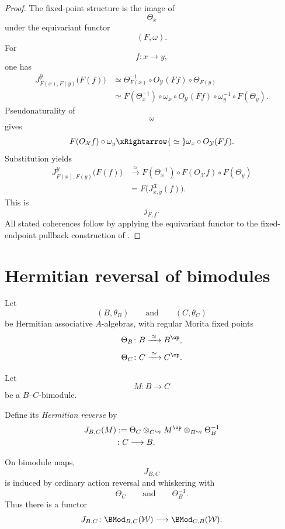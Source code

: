 \begin{proof}
The fixed-point structure is the image of
\[
    \Theta_x
\]
under the equivariant functor
\[
    (F,\omega).
\]
For
\[
    f
    \colon
    x
    \longrightarrow
    y,
\]
one has
\[
\begin{aligned}
    J^{\mathcal Y}_{F(x),F(y)}
    \bigl(
        F(f)
    \bigr)
    &\simeq
    \Theta_{F(x)}^{-1}
    \circ
    O_{\mathcal Y}(Ff)
    \circ
    \Theta_{F(y)}
    \\
    &\simeq
    F(\Theta_x^{-1})
    \circ
    \omega_x
    \circ
    O_{\mathcal Y}(Ff)
    \circ
    \omega_y^{-1}
    \circ
    F(\Theta_y).
\end{aligned}
\]
Pseudonaturality of
\[
    \omega
\]
gives
\[
    F(O_{\mathcal X}f)
    \circ
    \omega_y
    \xRightarrow{\;\simeq\;}
    \omega_x
    \circ
    O_{\mathcal Y}(Ff).
\]
Substitution yields
\[
\begin{aligned}
    J^{\mathcal Y}_{F(x),F(y)}
    \bigl(
        F(f)
    \bigr)
    &\xrightarrow{\;\simeq\;}
    F(\Theta_x^{-1})
    \circ
    F(O_{\mathcal X}f)
    \circ
    F(\Theta_y)
    \\
    &=
    F
    \bigl(
        J^{\mathcal X}_{x,y}(f)
    \bigr).
\end{aligned}
\]
This is
\[
    j_{F,f}.
\]
All stated coherences follow by applying the equivariant functor to the
fixed-endpoint pullback construction of
.
\end{proof}

\section{Hermitian reversal of bimodules}
\label{sec:hermitian-reversal-bimodules}

Let
\[
    (B,\theta_B)
    \qquad\text{and}\qquad
    (C,\theta_C)
\]
be Hermitian associative $A$-algebras, with regular Morita fixed points
\[
    \Theta_B
    \colon
    B
    \xrightarrow{\;\simeq\;}
    B^{\op},
\]
\[
    \Theta_C
    \colon
    C
    \xrightarrow{\;\simeq\;}
    C^{\op}.
\]

\begin{construction}
\label{con:hermitian-action-reversal}
Let
\[
    M
    \colon
    B
    \longrightarrow
    C
\]
be a $B$--$C$-bimodule.

Define its \emph{Hermitian reverse} by
\[
\begin{aligned}
    J_{B,C}(M)
    &:=
    \Theta_C
    \otimes_{C^{\op}}
    M^{\op}
    \otimes_{B^{\op}}
    \Theta_B^{-1}
    \\
    &\colon
    C
    \longrightarrow
    B.
\end{aligned}
\]

On bimodule maps,
\[
    J_{B,C}
\]
is induced by ordinary action reversal and whiskering with
\[
    \Theta_C
    \qquad\text{and}\qquad
    \Theta_B^{-1}.
\]
Thus there is a functor
\[
    J_{B,C}
    \colon
    \BMod_{B,C}(\mathcal W)
    \longrightarrow
    \BMod_{C,B}(\mathcal W).
\]
\end{construction}

